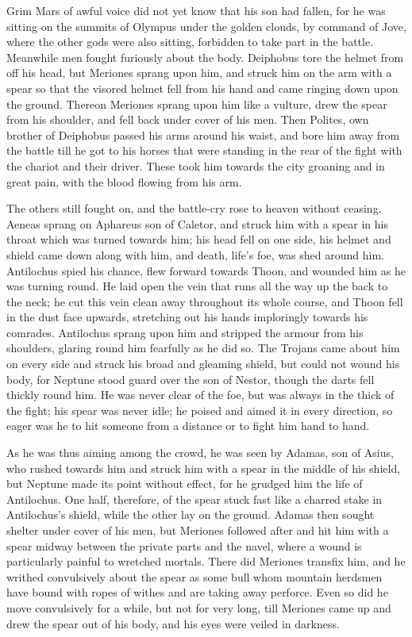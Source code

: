 Grim Mars of awful voice did not yet know that his son had fallen, for he
was sitting on the summits of Olympus under the golden clouds, by command
of Jove, where the other gods were also sitting, forbidden to take part in
the battle. Meanwhile men fought furiously about the body. Deiphobus tore
the helmet from off his head, but Meriones sprang upon him, and struck him
on the arm with a spear so that the visored helmet fell from his hand and
came ringing down upon the ground. Thereon Meriones sprang upon him like a
vulture, drew the spear from his shoulder, and fell back under cover of
his men. Then Polites, own brother of Deiphobus passed his arms around his
waist, and bore him away from the battle till he got to his horses that
were standing in the rear of the fight with the chariot and their driver.
These took him towards the city groaning and in great pain, with the blood
flowing from his arm.

The others still fought on, and the battle-cry rose to heaven without
ceasing. Aeneas sprang on Aphareus son of Caletor, and struck him with a
spear in his throat which was turned towards him; his head fell on one
side, his helmet and shield came down along with him, and death, life’s
foe, was shed around him. Antilochus spied his chance, flew forward
towards Thoon, and wounded him as he was turning round. He laid open the
vein that runs all the way up the back to the neck; he cut this vein clean
away throughout its whole course, and Thoon fell in the dust face upwards,
stretching out his hands imploringly towards his comrades. Antilochus
sprang upon him and stripped the armour from his shoulders, glaring round
him fearfully as he did so. The Trojans came about him on every side and
struck his broad and gleaming shield, but could not wound his body, for
Neptune stood guard over the son of Nestor, though the darts fell thickly
round him. He was never clear of the foe, but was always in the thick of
the fight; his spear was never idle; he poised and aimed it in every
direction, so eager was he to hit someone from a distance or to fight him
hand to hand.

As he was thus aiming among the crowd, he was seen by Adamas, son of
Asius, who rushed towards him and struck him with a spear in the middle of
his shield, but Neptune made its point without effect, for he grudged him
the life of Antilochus. One half, therefore, of the spear stuck fast like
a charred stake in Antilochus’s shield, while the other lay on the ground.
Adamas then sought shelter under cover of his men, but Meriones followed
after and hit him with a spear midway between the private parts and the
navel, where a wound is particularly painful to wretched mortals. There
did Meriones transfix him, and he writhed convulsively about the spear as
some bull whom mountain herdsmen have bound with ropes of withes and are
taking away perforce. Even so did he move convulsively for a while, but
not for very long, till Meriones came up and drew the spear out of his
body, and his eyes were veiled in darkness.

